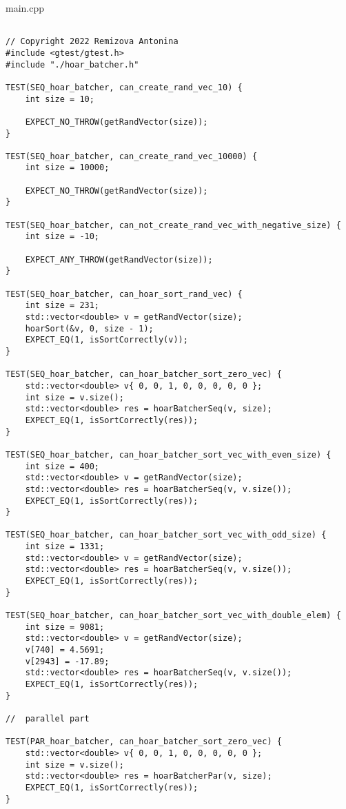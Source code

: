 \documentclass{report}
\begin{document}
\par main.cpp
\begin{lstlisting}

// Copyright 2022 Remizova Antonina
#include <gtest/gtest.h>
#include "./hoar_batcher.h"

TEST(SEQ_hoar_batcher, can_create_rand_vec_10) {
    int size = 10;

    EXPECT_NO_THROW(getRandVector(size));
}

TEST(SEQ_hoar_batcher, can_create_rand_vec_10000) {
    int size = 10000;

    EXPECT_NO_THROW(getRandVector(size));
}

TEST(SEQ_hoar_batcher, can_not_create_rand_vec_with_negative_size) {
    int size = -10;

    EXPECT_ANY_THROW(getRandVector(size));
}

TEST(SEQ_hoar_batcher, can_hoar_sort_rand_vec) {
    int size = 231;
    std::vector<double> v = getRandVector(size);
    hoarSort(&v, 0, size - 1);
    EXPECT_EQ(1, isSortCorrectly(v));
}

TEST(SEQ_hoar_batcher, can_hoar_batcher_sort_zero_vec) {
    std::vector<double> v{ 0, 0, 1, 0, 0, 0, 0, 0 };
    int size = v.size();
    std::vector<double> res = hoarBatcherSeq(v, size);
    EXPECT_EQ(1, isSortCorrectly(res));
}

TEST(SEQ_hoar_batcher, can_hoar_batcher_sort_vec_with_even_size) {
    int size = 400;
    std::vector<double> v = getRandVector(size);
    std::vector<double> res = hoarBatcherSeq(v, v.size());
    EXPECT_EQ(1, isSortCorrectly(res));
}

TEST(SEQ_hoar_batcher, can_hoar_batcher_sort_vec_with_odd_size) {
    int size = 1331;
    std::vector<double> v = getRandVector(size);
    std::vector<double> res = hoarBatcherSeq(v, v.size());
    EXPECT_EQ(1, isSortCorrectly(res));
}

TEST(SEQ_hoar_batcher, can_hoar_batcher_sort_vec_with_double_elem) {
    int size = 9081;
    std::vector<double> v = getRandVector(size);
    v[740] = 4.5691;
    v[2943] = -17.89;
    std::vector<double> res = hoarBatcherSeq(v, v.size());
    EXPECT_EQ(1, isSortCorrectly(res));
}

//  parallel part

TEST(PAR_hoar_batcher, can_hoar_batcher_sort_zero_vec) {
    std::vector<double> v{ 0, 0, 1, 0, 0, 0, 0, 0 };
    int size = v.size();
    std::vector<double> res = hoarBatcherPar(v, size);
    EXPECT_EQ(1, isSortCorrectly(res));
}


\end{lstlisting}
\end{document}
